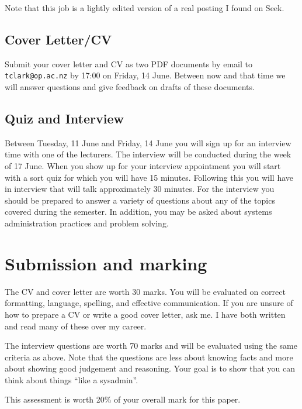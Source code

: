 \documentclass{article}   	%
\begin{document}
Note that this job is a lightly edited version of a real posting I found on Seek.

\subsection{Cover Letter/CV}

Submit your cover letter and CV as two PDF documents by email to \texttt{tclark@op.ac.nz} by 17:00 on Friday, 14 June.  Between now and that time we will answer questions and give feedback on drafts of these documents.  

\subsection{Quiz and Interview}

Between Tuesday, 11 June and Friday, 14 June you will sign up for an interview time with one of the lecturers. The interview will be conducted during the week of 17 June. When you show up for your interview appointment you will start with a sort quiz for which you will have 15 minutes. Following this you will have in interview that will talk approximately 30 minutes. For the interview you should be prepared to answer a variety of questions about any of the topics covered during the semester. In addition, you may be asked about systems administration practices and problem solving.

\newpage

\section{Submission and marking}

The CV and cover letter are worth 30 marks. You will be evaluated on correct formatting, language, spelling, and effective communication. If you are unsure of how to prepare a CV or write a good cover letter, ask me. I have both written and read many of these over my career. 

The interview questions are worth 70 marks and will be evaluated using the same criteria as above. Note that the questions are less about knowing facts and more about showing good judgement and reasoning. Your goal is to show that you can think about things ``like a sysadmin''.

This assessment is worth 20\% of your overall mark for this paper.
 
\end{document}

